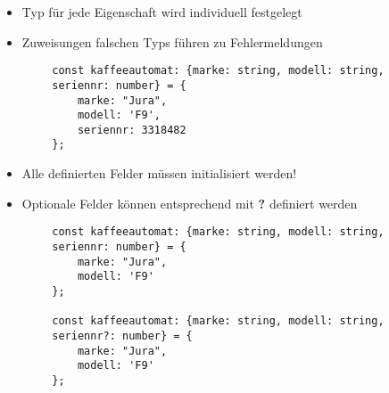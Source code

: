 \documentclass[10pt]{article}
\begin{document}
    \begin{tcolorbox}[
    colback=Blue!5!white,
    colframe=Blue!75!black,
    title={\centering Objekte}]
    \begin{itemize}
        \item Typ für jede Eigenschaft wird individuell festgelegt
        \item Zuweisungen falschen Typs führen zu Fehlermeldungen
    \end{itemize}
    \begin{lstlisting}
        const kaffeeautomat: {marke: string, modell: string,
        seriennr: number} = {
            marke: "Jura",
            modell: 'F9',
            seriennr: 3318482
        };
    \end{lstlisting}
    \begin{itemize}
        \item Alle definierten Felder müssen initialisiert werden!
        \item Optionale Felder können entsprechend mit \textbf{?} definiert werden
    \end{itemize}
    \begin{lstlisting}
        const kaffeeautomat: {marke: string, modell: string,
        seriennr: number} = {
            marke: "Jura",
            modell: 'F9'
        };

        const kaffeeautomat: {marke: string, modell: string,
        seriennr?: number} = {
            marke: "Jura",
            modell: 'F9'
        };
    \end{lstlisting}
    \end{tcolorbox}
\end{document}
